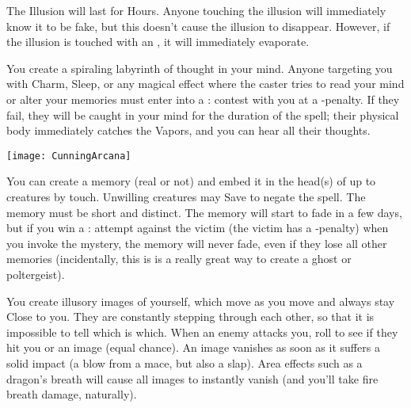 The Illusion will last for \DICE Hours.  Anyone touching the illusion will immediately know it to be fake, but this doesn't cause the illusion to
disappear.  However, if the illusion is touched with an , it will immediately evaporate.

\MYSTERY [
  Name = Labyrinth,
  Link = arcana-mystery-labyrinth,
  Paradigm = Mind,
  Save = N,
  Duration = Combat or \SUM Minutes,
  Target = Self
]

You create a spiraling labyrinth of thought in your mind.  Anyone targeting you with Charm, Sleep, or any magical effect where the caster tries to read your mind or alter your memories must enter into a \RB : \FOC contest with you at a -\DICE penalty.  If they fail, they will be caught in your mind for the duration of the spell;  their physical body immediately catches the Vapors, and you can hear all their thoughts.

  \begin{center}
  \texttt{[image: CunningArcana]}
  \end{center}



\MYSTERY [
  Name = Memory Lane,
  Link = arcana-mystery-memory-lane,
  Paradigm = Mind,
  Save = Y (neg.),
  Duration = Varies,
  Target = Close Target(s)
]

You can create a memory (real or not) and embed it in the head(s) of up to \DICE creatures by touch.  Unwilling creatures may Save to negate the spell.  The memory must be short and distinct.  The memory will start to fade in a few days, but if you win a \RB : \FOC attempt against the victim (the victim has a -\DICE penalty) when you invoke the mystery, the memory will never fade, even if they lose all other memories (incidentally, this is is a really great way to create a ghost or poltergeist).

\MYSTERY [
  Name = Mirror Image,
  Link = arcana-mystery-mirror-image,
  Paradigm = Mind,
  Save = n/a,
  Duration = Minutes,
  Target = Self
]

You create \DICE illusory images of yourself, which move as you move and always stay Close to you. They are constantly stepping through each other, so that it is impossible to tell which is which. When an enemy attacks you, roll to see if they hit you or an image (equal chance). An image vanishes as soon as it suffers a solid impact (a blow from a mace, but also a slap). Area effects such as a dragon's breath will cause all images to instantly vanish (and you'll take fire breath damage, naturally).


